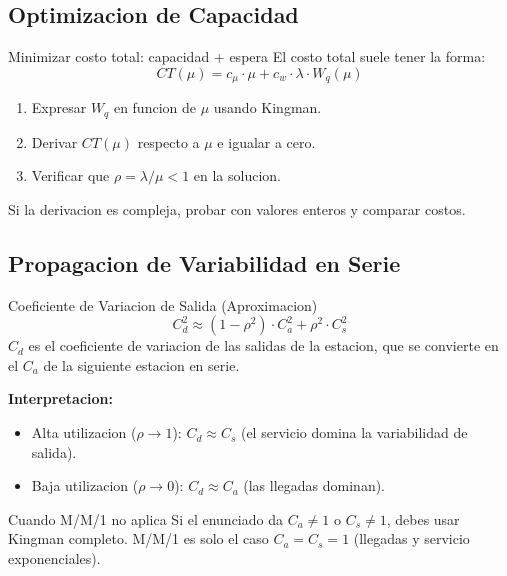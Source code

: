\documentclass[11pt, a4paper]{article}
\begin{document}
\subsection{Optimizacion de Capacidad}

\begin{tipprueba}{Minimizar costo total: capacidad + espera}
  El costo total suele tener la forma:
  \[
    CT(\mu) = c_\mu \cdot \mu + c_w \cdot \lambda \cdot W_q(\mu)
  \]
  \begin{enumerate}[leftmargin=1.5em, itemsep=2pt]
    \item Expresar $W_q$ en funcion de $\mu$ usando Kingman.
    \item Derivar $CT(\mu)$ respecto a $\mu$ e igualar a cero.
    \item Verificar que $\rho = \lambda/\mu < 1$ en la solucion.
  \end{enumerate}
  Si la derivacion es compleja, probar con valores enteros y comparar costos.
\end{tipprueba}

\subsection{Propagacion de Variabilidad en Serie}

\begin{formulas}{Coeficiente de Variacion de Salida (Aproximacion)}
  \[
    C_{d}^2 \approx (1 - \rho^2) \cdot C_a^2 + \rho^2 \cdot C_s^2
  \]
  $C_d$ es el coeficiente de variacion de las salidas de la estacion,
  que se convierte en el $C_a$ de la siguiente estacion en serie.

  \medskip
  \textbf{Interpretacion:}
  \begin{itemize}[leftmargin=1.2em, itemsep=1pt]
    \item Alta utilizacion ($\rho \to 1$): $C_d \approx C_s$ (el servicio domina la variabilidad de salida).
    \item Baja utilizacion ($\rho \to 0$): $C_d \approx C_a$ (las llegadas dominan).
  \end{itemize}
\end{formulas}

\begin{trampa}{Cuando M/M/1 no aplica}
  Si el enunciado da $C_a \ne 1$ o $C_s \ne 1$, debes usar Kingman completo.
  M/M/1 es solo el caso $C_a = C_s = 1$ (llegadas y servicio exponenciales).
\end{trampa}
\end{document}
